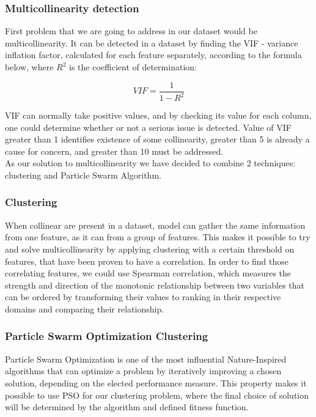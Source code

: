 \documentclass[conference]{IEEEtran}
\begin{document}
\subsubsection{Multicollinearity detection}

First problem that we are going to address in our dataset would be multicollinearity. It can be detected in a dataset by finding the VIF - variance inflation factor, calculated for each feature separately, according to the formula below, where $R^2$ is the coefficient of determination: 

\begin{equation}
	VIF=\frac{1}{1-R^2}
\end{equation}

VIF can normally take positive values, and by checking its value for each column, one could determine whether or not a serious issue is detected. Value of VIF greater than 1 identifies existence of some collinearity, greater than 5 is already a cause for concern, and greater than 10 must be addressed\cite{menard2002applied}.\\

As our solution to multicollinearity we have decided to combine 2 techniques: clustering and Particle Swarm Algorithm.\\

\subsubsection{Clustering}

When collinear are present in a dataset, model can gather the same information from one feature, as it can from a group of features. This makes it possible to try and solve multicollinearity by applying clustering with a certain threshold on features, that have been proven to have a correlation\cite{sklearnClustering}. In order to find those correlating features, we could use Spearman correlation, which measures the strength and direction of the monotonic relationship between two variables that can be ordered by transforming their values to ranking in their respective domains and comparing their relationship.\\

\subsubsection{Particle Swarm Optimization Clustering}

Particle Swarm Optimization is one of the most influential Nature-Inspired algorithms that can optimize a problem by iteratively improving a chosen solution, depending on the elected performance measure\cite{ballardini2018tutorial}. This property makes it possible to use PSO for our clustering problem, where the final choice of solution will be determined by the algorithm and defined fitness function.
\end{document}
